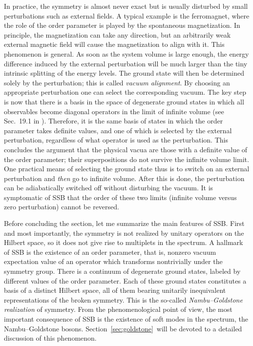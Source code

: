 \documentclass[final,3p,times,12pt,a4paper,sort&compress]{elsarticle}
\begin{document}
In practice, the symmetry is almost never exact but is usually disturbed by
small perturbations such as external fields. A typical example is the
ferromagnet, where the role of the order parameter is played by the spontaneous
magnetization. In principle, the magnetization can take any direction, but an
arbitrarily weak external magnetic field will cause the magnetization to align
with it. This phenomenon is general. As soon as the system volume is
large enough, the energy difference induced by the external perturbation will
be much larger than the tiny intrinsic splitting of the energy levels. The
ground state will then be determined solely by the perturbation; this is called
\emph{vacuum alignment}. By choosing an appropriate perturbation one can select
the corresponding vacuum. The key step is now that there is a basis in the
space of degenerate ground states in which all observables become diagonal
operators in the limit of infinite volume (see Sec.~19.1 in
\cite{Weinberg:1996v2}). Therefore, it
is the same basis of states in which the order parameter takes definite values,
and one of which is selected by the external perturbation, regardless of what
operator is used as the perturbation. This concludes the argument that the
physical vacua are those with a definite value of the order parameter; their
superpositions do not survive the infinite volume limit. One practical means of
selecting the ground state thus is to switch on an external perturbation and
\emph{then} go to infinite volume. After this is done, the perturbation can be
adiabatically switched off without disturbing the vacuum. It is symptomatic of
SSB that the order of these two limits (infinite volume versus zero
perturbation) cannot be reversed.

Before concluding the section, let me summarize the main features of SSB. First
and most importantly, the symmetry is not realized by unitary operators on the
Hilbert space, so it does not give rise to multiplets in the spectrum. A
hallmark of SSB is the existence of an order parameter, that is, nonzero vacuum
expectation value of an operator which transforms nontrivially under the
symmetry group. There is a continuum of degenerate ground states,
labeled by different values of the order parameter. Each of these ground states
constitutes a basis of a distinct Hilbert space, all of them bearing unitarily
inequivalent representations of the broken symmetry. This is the so-called
\emph{Nambu--Goldstone realization} of symmetry. From the phenomenological
point of view, the most important consequence of SSB is the existence of soft
modes in the spectrum, the Nambu--Goldstone bosons.
Section~\ref{sec:goldstone}\ will be devoted to a detailed discussion of this
phenomenon.
\end{document}

